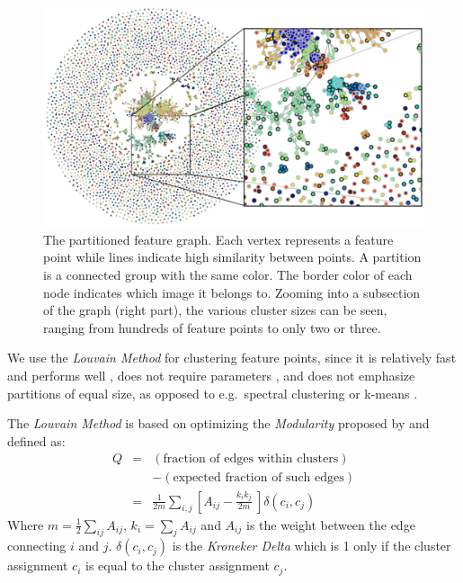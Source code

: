 \begin{figure}[t]
    \centering
	\includegraphics[width=\textwidth]{images/MMC_graph}
    \caption{The partitioned feature graph. Each vertex represents a 
        feature point while lines indicate high similarity between 
        points.  A partition is a connected group with the same color.  
        The border color of each node indicates which image it belongs 
        to.  Zooming into a subsection of the graph (right part), the 
    various cluster sizes can be seen, ranging from hundreds of feature 
points to only two or three.}
    \label{fig:graph-view}
\end{figure}

We use the \emph{Louvain Method} \cite{blondel2008} for clustering 
feature points, since it is relatively fast and performs well 
\cite{lancichinetti2009}, does not require parameters 
\cite{blondel2008}, and does not emphasize partitions of equal size, as 
opposed to e.g.\ spectral clustering or k-means \cite{von2007}.

The \emph{Louvain Method} is based on optimizing the \emph{Modularity} 
proposed by \cite{girvan2002} and defined as:
\begin{eqnarray*}
    Q & = & (\mbox{fraction of edges within clusters}) \\
	  & & - (\mbox{expected fraction of such edges}) \\
	& = & \frac{1}{2m} \sum_{i,j} \left[ A_{ij} - \frac{k_i k_j}{2m} \
\right] \delta(c_i, c_j)
\end{eqnarray*}
Where $m=\frac{1}{2} \sum_{ij} A_{ij}$, $k_i = \sum_j A_{ij}$ and 
$A_{ij}$ is the weight between the edge connecting $i$ and $j$.  
$\delta(c_i, c_j)$ is the \emph{Kroneker Delta} which is 1 only if the 
cluster assignment $c_i$ is equal to the cluster assignment $c_j$.

